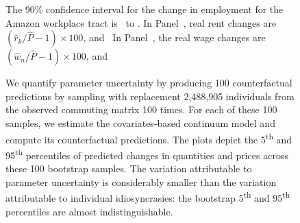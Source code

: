 \documentclass[11pt]{article}
\theoremstyle{definition}
\begin{document}
\begin{figure}[h!]
\begin{center}
\begin{minipage}{0.96\textwidth}
{The 90\% confidence interval for the change in employment for the Amazon workplace tract is \unskip\ to \unskip.
In Panel~,
real rent changes are $(\hat{r}_{k}/\hat{P} - 1) \times 100$,
and
\unskip\
In Panel~,
the real wage changes are $(\hat{w}_{n}/\hat{P} - 1) \times 100$,
and 

We quantify parameter uncertainty by producing 100 counterfactual predictions by
sampling with replacement 2,488,905 individuals from the observed commuting matrix 100 times.
For each of these 100 samples,
we estimate the covariates-based continuum model and compute its counterfactual predictions.
The plots depict the 5\textsuperscript{th} and 95\textsuperscript{th} percentiles of predicted changes in quantities and prices across these 100 bootstrap samples.
The variation attributable to parameter uncertainty is considerably smaller 
than 
the variation attributable to individual idiosyncrasies:
the bootstrap 5\textsuperscript{th} and 95\textsuperscript{th} percentiles are almost indistinguishable.
\par}
\end{minipage}
\end{center}
\end{figure}
\end{document}
